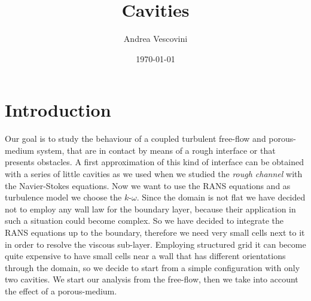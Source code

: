 \documentclass[11pt, a4paper]{article}
\title{\textbf{Cavities}}
\author{Andrea Vescovini}
\date{\today}
\theoremstyle{definition}
\begin{document}
	\maketitle
	
\section{Introduction}
Our goal is to study the behaviour of a coupled turbulent free-flow and 
porous-medium 
system, that are in contact by means of a rough interface or that presents 
obstacles. A first 
approximation of this kind of interface can be obtained with a series of little 
cavities as we used when we studied the \emph{rough channel} with the 
Navier-Stokes equations. Now we want to use the RANS equations and as 
turbulence model we 
choose the $k\text{-}\omega$. Since the domain is not flat we have decided not 
to employ any wall law for the boundary layer, because their application in 
such a situation could become complex. So we have decided to integrate the RANS 
equations up to the boundary, therefore we need very small cells next to it in 
order to resolve the viscous sub-layer. Employing structured grid it can become 
quite expensive to have small cells near a wall that has different orientations 
through the domain, so we decide to start from a simple 
configuration with only two cavities. We start our analysis from the free-flow, 
then we take into account the effect of a porous-medium.
\end{document}
